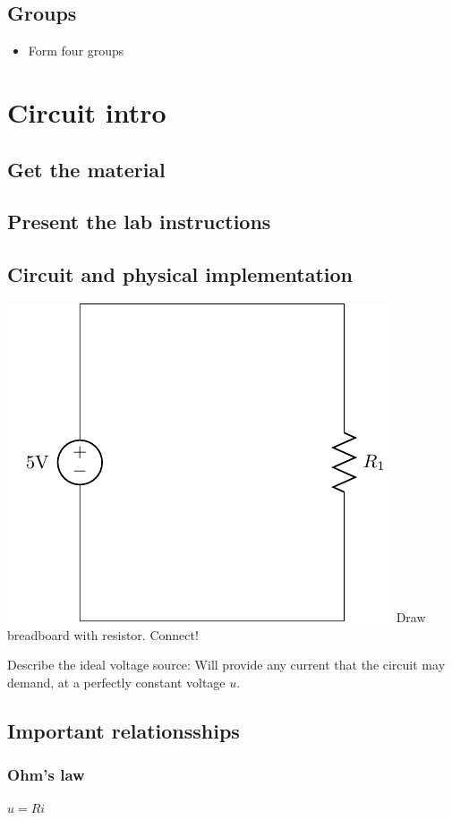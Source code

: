 \documentclass[a4paper]{scrartcl}
\begin{document}
\subsection{Groups}
\label{sec-1-4}
\begin{itemize}
\item Form four groups
\end{itemize}

\section{Circuit intro}
\label{sec-2}

\subsection{Get the material}
\label{sec-2-1}

\subsection{Present the lab instructions}
\label{sec-2-2}

\subsection{Circuit and physical implementation}
\label{sec-2-3}

\begin{center}
\includegraphics[width=0.4\linewidth]{../../figures/R-circuit}
Draw breadboard with resistor. Connect!
\end{center}

Describe the ideal voltage source: Will provide any current that the circuit may demand, at a perfectly constant voltage $u$. 

\subsection{Important relationsships}
\label{sec-2-4}

\subsubsection{Ohm's law}
\label{sec-2-4-1}
\(u = Ri\)
\end{document}
